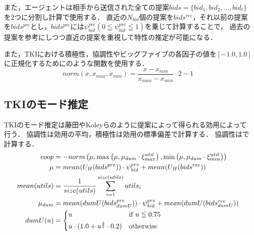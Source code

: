 また，エージェントは相手から送信された全ての提案$bids = \{ bid_1, bid_2, \ldots , bid_t \}$を2つに分割し計算で使用する．
直近の$N_{\mathit{bid}}$個の提案を$bids^{rec}$，それ以前の提案を$bids^{pre}$とし，$bids^{pre}$には$\psi_{\mathit{bid}}^{pre}(0 \leqq \psi_{\mathit{bid}}^{pre} \leqq 1)$を乗じて計算することで，
過去の提案を参考にしつつ直近の提案を重視して特性の推定が可能になる．

また，TKIにおける積極性，協調性やビッグファイブの各因子の値を$[-1.0, 1.0]$に正規化するためにのような関数を使用する．
\begin{equation}
    norm(x, x_{max}, x_{min}) = \frac{x - x_{min}}{x_{max} - x_{min}} \cdot 2 - 1
    \label{eq:normarize}
\end{equation}

\subsection{TKIのモード推定}
TKIのモード推定は藤田\cite{tki-aa}やKoleyら\cite{tki-ha}のように提案によって得られる効用によって行う．
協調性は効用の平均，積極性は効用の標準偏差で計算する．
協調性はで計算する．
\begin{align}
    coop &= -norm \left(\mu, \max \left( \mu, \mu_{dum} \cdot \xi_{max}^{util}\right) , \min \left( \mu, \mu_{dum} \cdot \xi_{min}^{util} \right) \right) \label{eq:cooperativeness} \\
    \mu &= mean(U_H(bids^{pre})) \cdot \psi_{\mathit{bid}}^{pre} + mean(U_H(bids^{rec})) \nonumber \\
    mean(utils) &= \frac{1}{size(utils)}\sum_{i = 1}^{size(utils)} utils_i \nonumber \\
    \mu_{dum} &= mean(dumU(bids_{dumU}^{pre})) \cdot \psi_{\mathit{bid}}^{pre} + mean(dumU(bids_{dumU}^{rec})) \nonumber \\
    dumU(u) &=
    \begin{cases*}
        u & if $u \leqq 0.75$ \\
        u \cdot (1.0 + u^{\frac{3}{2}} \cdot 0.2) & otherwise \\
    \end{cases*} \label{eq:dummyMean}
\end{align}

